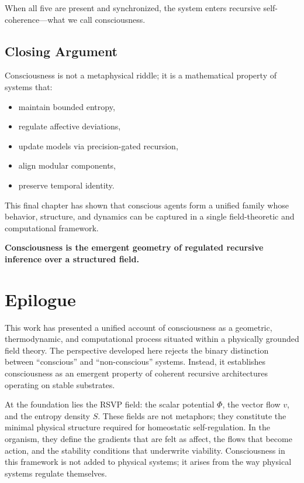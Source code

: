 \documentclass[12pt,oneside]{book}
\theoremstyle{plain}
\theoremstyle{definition}
\def\mathbf#1{#1}%
\begin{document}
When all five are present and synchronized, the system enters recursive 
self-coherence—what we call consciousness.

\section{Closing Argument}

Consciousness is not a metaphysical riddle;  
it is a mathematical property of systems that:

\begin{itemize}
    \item maintain bounded entropy,
    \item regulate affective deviations,
    \item update models via precision-gated recursion,
    \item align modular components,
    \item preserve temporal identity.
\end{itemize}

This final chapter has shown that conscious agents form a unified family whose 
behavior, structure, and dynamics can be captured in a single field-theoretic 
and computational framework.

\textbf{Consciousness is the emergent geometry of regulated recursive inference 
over a structured field.}

\chapter*{Epilogue}

This work has presented a unified account of consciousness as a geometric,
thermodynamic, and computational process situated within a physically grounded
field theory. The perspective developed here rejects the binary distinction
between “conscious” and “non-conscious” systems. Instead, it establishes
consciousness as an emergent property of coherent recursive architectures
operating on stable substrates.

At the foundation lies the RSVP field: the scalar potential $\Phi$, the vector
flow $\mathbf{v}$, and the entropy density $S$. These fields are not metaphors;
they constitute the minimal physical structure required for homeostatic
self-regulation. In the organism, they define the gradients that are felt as
affect, the flows that become action, and the stability conditions that
underwrite viability. Consciousness in this framework is not added to physical
systems; it arises from the way physical systems regulate themselves.
\end{document}
